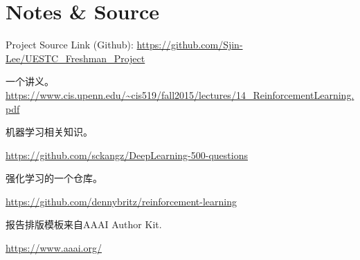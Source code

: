 \documentclass[letterpaper]{article} %
\begin{document}
\section{Notes \& Source}

Project Source Link (Github):
\url{https://github.com/Sjin-Lee/UESTC_Freshman_Project}




\begin{thebibliography}{100}%
	一个讲义。
	\url{https://www.cis.upenn.edu/~cis519/fall2015/lectures/14_ReinforcementLearning.pdf} 
	
	机器学习相关知识。
	
	\url{https://github.com/sckangz/DeepLearning-500-questions}
	
	强化学习的一个仓库。
	
	\url{https://github.com/dennybritz/reinforcement-learning}
	
	报告排版模板来自AAAI Author Kit. 
	
	\url{https://www.aaai.org/}
	
\end{thebibliography}
\end{document}
